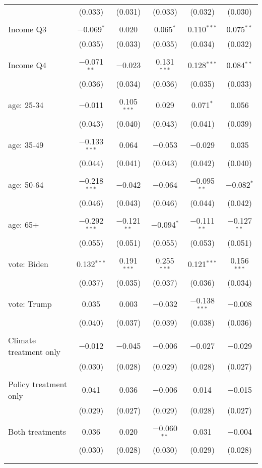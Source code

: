 \begin{tabular}{@{\extracolsep{5pt}}lccccc}
  & (0.033) & (0.031) & (0.033) & (0.032) & (0.030) \\ 
  & & & & & \\ 
 Income Q3 & $-$0.069$^{*}$ & 0.020 & 0.065$^{*}$ & 0.110$^{***}$ & 0.075$^{**}$ \\ 
  & (0.035) & (0.033) & (0.035) & (0.034) & (0.032) \\ 
  & & & & & \\ 
 Income Q4 & $-$0.071$^{**}$ & $-$0.023 & 0.131$^{***}$ & 0.128$^{***}$ & 0.084$^{**}$ \\ 
  & (0.036) & (0.034) & (0.036) & (0.035) & (0.033) \\ 
  & & & & & \\ 
 age: 25-34 & $-$0.011 & 0.105$^{***}$ & 0.029 & 0.071$^{*}$ & 0.056 \\ 
  & (0.043) & (0.040) & (0.043) & (0.041) & (0.039) \\ 
  & & & & & \\ 
 age: 35-49 & $-$0.133$^{***}$ & 0.064 & $-$0.053 & $-$0.029 & 0.035 \\ 
  & (0.044) & (0.041) & (0.043) & (0.042) & (0.040) \\ 
  & & & & & \\ 
 age: 50-64 & $-$0.218$^{***}$ & $-$0.042 & $-$0.064 & $-$0.095$^{**}$ & $-$0.082$^{*}$ \\ 
  & (0.046) & (0.043) & (0.046) & (0.044) & (0.042) \\ 
  & & & & & \\ 
 age: 65+ & $-$0.292$^{***}$ & $-$0.121$^{**}$ & $-$0.094$^{*}$ & $-$0.111$^{**}$ & $-$0.127$^{**}$ \\ 
  & (0.055) & (0.051) & (0.055) & (0.053) & (0.051) \\ 
  & & & & & \\ 
 vote: Biden & 0.132$^{***}$ & 0.191$^{***}$ & 0.255$^{***}$ & 0.121$^{***}$ & 0.156$^{***}$ \\ 
  & (0.037) & (0.035) & (0.037) & (0.036) & (0.034) \\ 
  & & & & & \\ 
 vote: Trump & 0.035 & 0.003 & $-$0.032 & $-$0.138$^{***}$ & $-$0.008 \\ 
  & (0.040) & (0.037) & (0.039) & (0.038) & (0.036) \\ 
  & & & & & \\ 
 Climate treatment only & $-$0.012 & $-$0.045 & $-$0.006 & $-$0.027 & $-$0.029 \\ 
  & (0.030) & (0.028) & (0.029) & (0.028) & (0.027) \\ 
  & & & & & \\ 
 Policy treatment only & 0.041 & 0.036 & $-$0.006 & 0.014 & $-$0.015 \\ 
  & (0.029) & (0.027) & (0.029) & (0.028) & (0.027) \\ 
  & & & & & \\ 
 Both treatments & 0.036 & 0.020 & $-$0.060$^{**}$ & 0.031 & $-$0.004 \\ 
  & (0.030) & (0.028) & (0.030) & (0.029) & (0.028) \\ 
  & & & & & \\ 
\hline \\[-1.8ex] 


\end{tabular}
